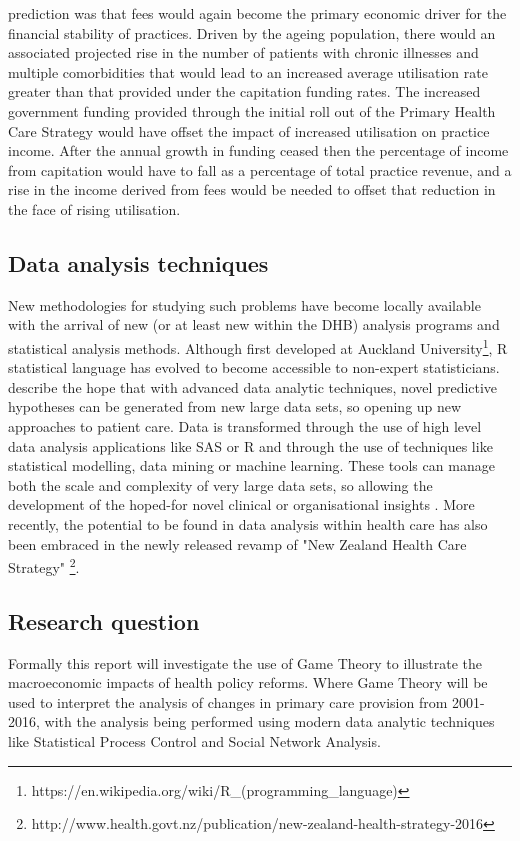 \documentclass[11pt,a4paper]{article}
\begin{document}
\citet{howell2005restructuring} prediction was that fees would again become the primary economic driver for the financial stability of practices. Driven by the ageing population, there would an associated projected rise in the number of patients with chronic illnesses and multiple comorbidities that would lead to an increased  average utilisation rate greater than that provided under the capitation funding rates. The increased government funding provided through the initial roll out of the Primary Health Care Strategy would have offset the impact of increased utilisation on practice income. After the annual growth in funding ceased then the percentage of income from capitation would have to fall as a percentage of total practice revenue, and a rise in the income derived from fees  would be needed to offset that reduction in the face of rising utilisation.\\


\subsection{Data analysis techniques}
New methodologies for studying such problems have become locally available with the arrival of new (or at least new within the DHB) analysis programs and statistical analysis methods. Although first developed at Auckland University\footnote{https://en.wikipedia.org/wiki/R\_(programming\_language)}, R statistical language has evolved to become accessible to non-expert statisticians. \citet{khoury2014big} describe the hope that with advanced data analytic techniques,  novel predictive hypotheses can be generated from new large data sets, so opening up new approaches to patient care. Data is transformed through the use of high level data analysis applications like SAS or R and through the use of techniques like statistical modelling, data mining or machine learning. These tools can manage both the scale and complexity of very large data sets, so allowing the development of the  hoped-for novel clinical or organisational insights \citep{reshef2011detecting}.  More recently, the potential to be found in data analysis within health care has also been embraced in the newly released revamp of "New Zealand Health Care Strategy" \footnote{http://www.health.govt.nz/publication/new-zealand-health-strategy-2016}. \\


\subsection{Research question}
Formally this report will investigate the use of Game Theory to illustrate the macroeconomic impacts of health policy reforms. Where Game Theory will be used to interpret the analysis of changes in primary care provision from 2001-2016, with the analysis being performed using modern data analytic techniques like Statistical Process Control and Social Network Analysis.\\
\end{document}
